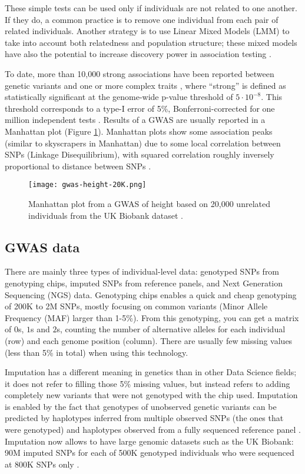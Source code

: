 These simple tests can be used only if individuals are not related to one another. If they do, a common practice is to remove one individual from each pair of related individuals. Another strategy is to use Linear Mixed Models (LMM) to take into account both relatedness and population structure; these mixed models have also the potential to increase discovery power in association testing \cite[]{yang2014advantages}.

To date, more than 10,000 strong associations have been reported between genetic variants and one or more complex traits \cite[]{welter2013nhgri}, where ``strong'' is defined as statistically significant at the genome-wide p-value threshold of $5 \cdot 10^{-8}$. This threshold corresponds to a type-I error of 5\%, Bonferroni-corrected for one million independent tests \cite[]{pe2008estimation}. Results of a GWAS are usually reported in a Manhattan plot (Figure \ref{fig:gwas}). 
Manhattan plots show some association peaks (similar to skyscrapers in Manhattan) due to some local correlation between SNPs (Linkage Disequilibrium), with squared correlation roughly inversely proportional to distance between SNPs \cite[]{hudson2001two}.

\begin{figure}[htb]
\centerline{\texttt{[image: gwas-height-20K.png]}}
\caption{Manhattan plot from a GWAS of height based on 20,000 unrelated individuals from the UK Biobank dataset \cite[]{bycroft2017genome}.}\label{fig:gwas}
\end{figure}


\subsection{GWAS data}

There are mainly three types of individual-level data: genotyped SNPs from genotyping chips, imputed SNPs from reference panels, and Next Generation Sequencing (NGS) data.
Genotyping chips enables a quick and cheap genotyping of 200K to 2M SNPs, mostly focusing on common variants (Minor Allele Frequency (MAF) larger than 1-5\%). From this genotyping, you can get a matrix of $0$s, $1$s and $2$s, counting the number of alternative alleles for each individual (row) and each genome position (column). There are usually few missing values (less than 5\% in total) when using this technology.

Imputation has a different meaning in genetics than in other Data Science fields; it does not refer to filling those 5\% missing values, but instead refers to adding completely new variants that were not genotyped with the chip used. 
Imputation is enabled by the fact that genotypes of unobserved genetic variants can be predicted by haplotypes inferred from multiple observed SNPs (the ones that were genotyped) and haplotypes observed from a fully sequenced reference
panel \cite[]{marchini2010genotype,mccarthy2016reference}.
Imputation now allows to have large genomic datasets such as the UK Biobank: 90M imputed SNPs for each of 500K genotyped individuals who were sequenced at 800K SNPs only \cite[]{bycroft2017genome}.

